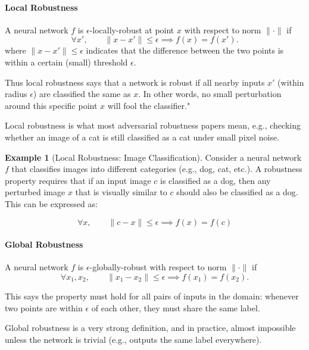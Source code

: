 \documentclass[oneside,11pt,dvipsnames]{book}
\numberwithin{equation}{section}
\theoremstyle{definition}
\newtheorem{example}{Example}[section]
\theoremstyle{remark}
\begin{document}
\paragraph{Local Robustness}
A neural network $f$ is $\epsilon$-locally-robust at point $x$ with respect to norm $\| \cdot \|$ if 
\begin{equation}
    \forall x', \qquad \|x-x'\| \leq \epsilon \implies f(x) = f(x').
\end{equation}
where $\|x - x'\| \leq \epsilon$ indicates that the difference between the two points is within a certain (small) threshold $\epsilon$.


Thus local robustness says that a network is robust if all nearby inputs $x'$ (within radius $\epsilon$) are classified the same as $x$. In other words, no small perturbation around this specific point $x$ will fool the classifier."

Local robustness is what most adversarial robustness papers mean, e.g., checking whether an image of a cat is still classified as a cat under small pixel noise.

\begin{example}[Local Robustness: Image Classification]
Consider a neural network $f$ that classifies images into different categories (e.g., dog, cat, etc.). A robustness property requires that if an input image $c$ is classified as a dog, then any perturbed image $x$ that is visually similar to $c$ should also be classified as a dog. This can be expressed as:

\[
\forall x, \qquad \|c - x\| \leq \epsilon \implies f(x) = f(c)
\]

\end{example}



\paragraph{Global Robustness}

A neural network $f$ is $\epsilon$-globally-robust with respect to norm $\| \cdot \|$ if 
\begin{equation}
    \forall x_1, x_2, \qquad \|x_1 - x_2\| \leq \epsilon \implies f(x_1) = f(x_2).
\end{equation}

 This says the property must hold for all pairs of inputs in the domain: whenever two points are within $\epsilon$ of each other, they must share the same label.
 
Global robustness is a very strong definition, and in practice, almost impossible unless the network is trivial (e.g., outputs the same label everywhere).
\end{document}
